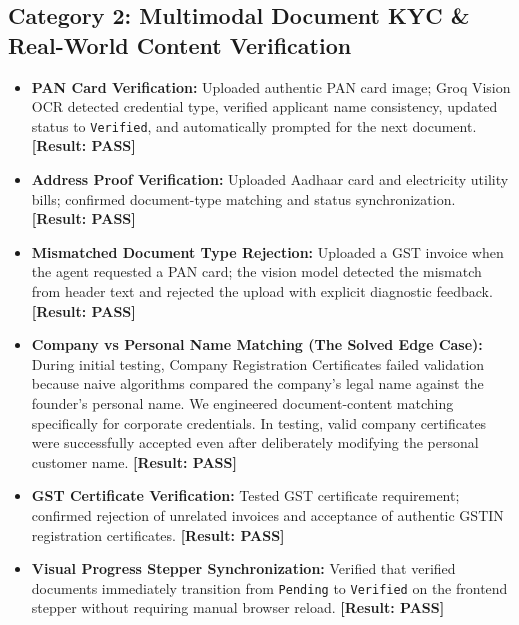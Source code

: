 \documentclass[12pt,a4paper]{article}
\begin{document}
\subsection{Category 2: Multimodal Document KYC \& Real-World Content Verification}
\begin{itemize}
    \item \textbf{PAN Card Verification:} Uploaded authentic PAN card image; Groq Vision OCR detected credential type, verified applicant name consistency, updated status to \texttt{Verified}, and automatically prompted for the next document. \textbf{[Result: PASS]}
    \item \textbf{Address Proof Verification:} Uploaded Aadhaar card and electricity utility bills; confirmed document-type matching and status synchronization. \textbf{[Result: PASS]}
    \item \textbf{Mismatched Document Type Rejection:} Uploaded a GST invoice when the agent requested a PAN card; the vision model detected the mismatch from header text and rejected the upload with explicit diagnostic feedback. \textbf{[Result: PASS]}
    \item \textbf{Company vs Personal Name Matching (The Solved Edge Case):} During initial testing, Company Registration Certificates failed validation because naive algorithms compared the company's legal name against the founder's personal name. We engineered document-content matching specifically for corporate credentials. In testing, valid company certificates were successfully accepted even after deliberately modifying the personal customer name. \textbf{[Result: PASS]}
    \item \textbf{GST Certificate Verification:} Tested GST certificate requirement; confirmed rejection of unrelated invoices and acceptance of authentic GSTIN registration certificates. \textbf{[Result: PASS]}
    \item \textbf{Visual Progress Stepper Synchronization:} Verified that verified documents immediately transition from \texttt{Pending} to \texttt{Verified} on the frontend stepper without requiring manual browser reload. \textbf{[Result: PASS]}
\end{itemize}
\end{document}
